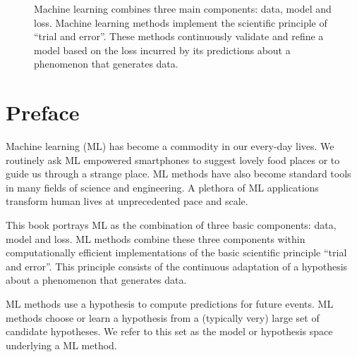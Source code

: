 \documentclass[12pt]{report}
\begin{document}
\begin{center}
\begin{figure}[htbp]
	\vspace*{-9mm}
	\caption{
		Machine learning combines three main components: data, model and loss. Machine learning 
		methods implement the scientific principle of ``trial and error''. These methods continuously validate and 
		refine a model based on the loss incurred by its predictions about a phenomenon that generates data.}
	\label{fig_AlexMLBP}
\end{figure}
\end{center}



\newpage
\chapter*{Preface}

Machine learning (ML) has become a commodity in our every-day lives. 
We routinely ask ML empowered smartphones to suggest lovely food 
places or to guide us through a strange place. ML methods have also 
become standard tools in many fields of science and engineering. A 
plethora of ML applications transform human lives at unprecedented 
pace and scale. 

This book portrays ML as the combination of three basic components: 
data, model and loss. ML methods combine these three components 
within computationally efficient implementations of the basic scientific 
principle ``trial and error''. This principle consists of the continuous 
adaptation of a hypothesis about a phenomenon that generates data. 

ML methods use a hypothesis to compute predictions for future events. 
ML methods choose or learn a hypothesis from a (typically very) large set 
of candidate hypotheses. We refer to this set as the model or hypothesis 
space underlying a ML method. 
\end{document}
